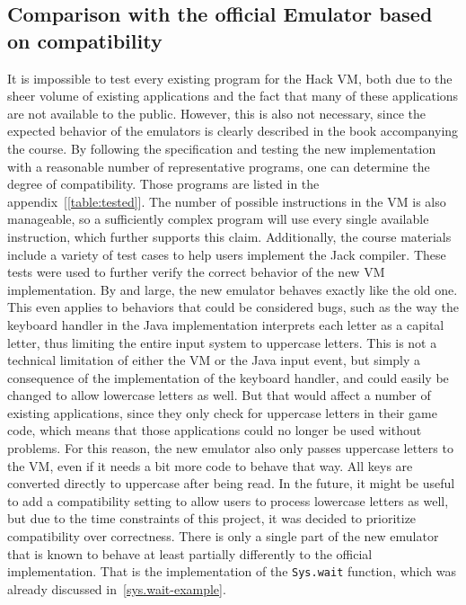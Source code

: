 \subsection{Comparison with the official Emulator based on compatibility} \label{compatibility}
It is impossible to test every existing program for the Hack VM, both due to the sheer volume of existing applications and the fact that many of these applications are not available to the public.
However, this is also not necessary, since the expected behavior of the emulators is clearly described in the book accompanying the course.
By following the specification and testing the new implementation with a reasonable number of representative programs, one can determine the degree of compatibility.
Those programs are listed in the appendix~[\ref{table:tested}].
The number of possible instructions in the VM is also manageable, so a sufficiently complex program will use every single available instruction, which further supports this claim.
Additionally, the course materials include a variety of test cases to help users implement the Jack compiler.
These tests were used to further verify the correct behavior of the new VM implementation.
By and large, the new emulator behaves exactly like the old one.
This even applies to behaviors that could be considered bugs, such as the way the keyboard handler in the Java implementation interprets each letter as a capital letter, thus limiting the entire input system to uppercase letters.
This is not a technical limitation of either the VM or the Java input event, but simply a consequence of the implementation of the keyboard handler, and could easily be changed to allow lowercase letters as well.
But that would affect a number of existing applications, since they only check for uppercase letters in their game code, which means that those applications could no longer be used without problems.
For this reason, the new emulator also only passes uppercase letters to the VM, even if it needs a bit more code to behave that way.
All keys are converted directly to uppercase after being read.
In the future, it might be useful to add a compatibility setting to allow users to process lowercase letters as well, but due to the time constraints of this project, it was decided to prioritize compatibility over correctness.
There is only a single part of the new emulator that is known to behave at least partially differently to the official implementation.
That is the implementation of the \verb+Sys.wait+ function, which was already discussed in~\cref{sys.wait-example}.

